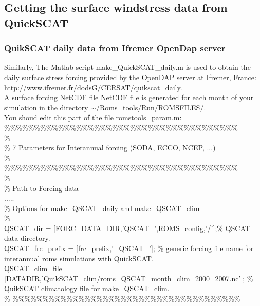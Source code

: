 \subsection{Getting the surface windstress data from QuickSCAT}

\subsubsection{QuikSCAT daily data from Ifremer OpenDap server}
\label{sec:quikscat-daily-data}


Similarly, The Matlab script make\_QuickSCAT\_daily.m is used to obtain the daily
surface stress forcing provided by the OpenDAP server at Ifremer, France: \\
http://www.ifremer.fr/dodsG/CERSAT/quikscat\_daily. \\
A surface forcing NetCDF file NetCDF file is generated for each month of your
simulation in the directory $\sim$/Roms\_tools/Run/ROMSFILES/. \\

\noindent You shoud edit this part of the file romstools\_param.m: \\


\noindent \%\%\%\%\%\%\%\%\%\%\%\%\%\%\%\%\%\%\%\%\%\%\%\%\%\%\%\%\%\%\%\%\%\%\%\%\%\%\%\\
\%\\
\% 7 Parameters for Interannual forcing (SODA, ECCO, NCEP, ...)\\
\%\\
\%\%\%\%\%\%\%\%\%\%\%\%\%\%\%\%\%\%\%\%\%\%\%\%\%\%\%\%\%\%\%\%\%\%\%\%\%\%\%\\
\%\\
\% Path to Forcing data\\
.....\\
\%  Options for make\_QSCAT\_daily and make\_QSCAT\_clim\\
\%\\
QSCAT\_dir        = [FORC\_DATA\_DIR,'QSCAT\_',ROMS\_config,'/'];\% QSCAT data directory.\\
QSCAT\_frc\_prefix = [frc\_prefix,'\_QSCAT\_'];  \% generic forcing file name for interannual roms simulations with QuickSCAT.\\
QSCAT\_clim\_file = [DATADIR,'QuikSCAT\_clim/roms\_QSCAT\_month\_clim\_2000\_2007.nc'];   \% QuikSCAT climatology file for make\_QSCAT\_clim.\\
\%
\%\%\%\%\%\%\%\%\%\%\%\%\%\%\%\%\%\%\%\%\%\%\%\%\%\%\%\%\%\%\%\%\%\%\%\%\%\%\\


